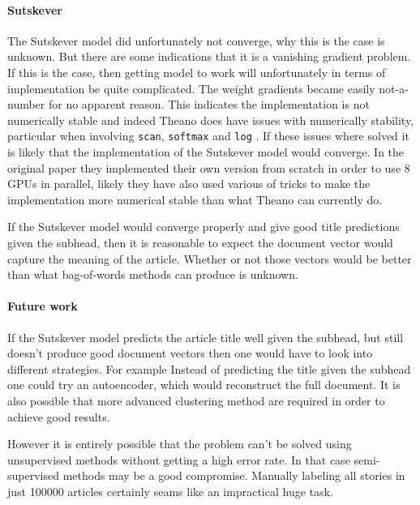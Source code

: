 \paragraph{Sutskever} The Sutskever model did unfortunately not converge, why this is the case is unknown. But there are some indications that it is a vanishing gradient problem. If this is the case, then getting model to work will unfortunately in terms of implementation be quite complicated. The weight gradients became easily not-a-number for no apparent reason. This indicates the implementation is not numerically stable and indeed Theano does have issues with numerically stability, particular when involving \texttt{scan}, \texttt{softmax} and \texttt{log} \cite{theano-issue}. If these issues where solved it is likely that the implementation of the Sutskever model would converge. In the original paper \cite{sutskever} they implemented their own version from scratch in order to use 8 GPUs in parallel, likely they have also used various of tricks to make the implementation more numerical stable than what Theano can currently do.

If the Sutskever model would converge properly and give good title predictions given the subhead, then it is reasonable to expect the document vector would capture the meaning of the article. Whether or not those vectors would be better than what bag-of-words methods can produce is unknown.

\paragraph{Future work} If the Sutskever model predicts the article title well given the subhead, but still doesn't produce good document vectors then one would have to look into different strategies. For example Instead of predicting the title given the subhead one could try an autoencoder, which would reconstruct the full document. It is also possible that more advanced clustering method are required in order to achieve good results.

However it is entirely possible that the problem can't be solved using unsupervised methods without getting a high error rate. In that case semi-supervised methods may be a good compromise. Manually labeling all stories in just 100000 articles certainly seams like an impractical huge task.
 